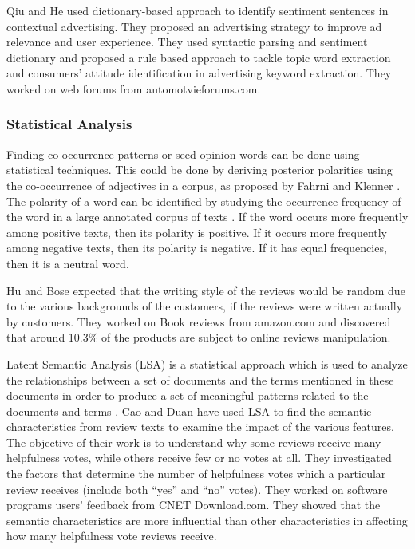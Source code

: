 Qiu and He \cite{qiu2010dasa} used dictionary-based approach to identify sentiment sentences in contextual advertising. They proposed an advertising strategy to improve ad relevance and user experience. They used syntactic parsing and sentiment dictionary and proposed a rule based approach to tackle topic word extraction and consumers’ attitude identification in advertising keyword extraction. They worked on web forums from automotvieforums.com. 



\subsubsection{Statistical Analysis}
Finding co-occurrence patterns or seed opinion words can be done using statistical techniques. This could be done by deriving posterior polarities using the co-occurrence of adjectives in a corpus, as proposed by Fahrni and Klenner \cite{fahrni2008old}.
The polarity of a word can be identified by studying the occurrence frequency of the word in a large annotated corpus of texts \cite{read2009weakly}. If the word occurs more frequently among positive texts, then its polarity is positive. If it occurs more frequently among negative texts, then its polarity is negative. If it has equal frequencies, then it is a neutral word.

Hu and Bose \cite{hu2012manipulation} expected that the writing style of the reviews would be random due to the various backgrounds of the customers, if the reviews were written actually by customers. They worked on Book reviews from amazon.com and discovered that around 10.3\% of the products are subject to online reviews manipulation.

Latent Semantic Analysis (LSA) is a statistical approach which is used to analyze the relationships between a set of documents and the terms mentioned in these documents in order to produce a set of meaningful patterns related to the documents and terms \cite{deerwester1990indexing}. Cao and Duan \cite{cao2011exploring} have used LSA to find the semantic characteristics from review texts to examine the impact of the various features. The objective of their work is to understand why some reviews receive many helpfulness votes, while others receive few or no votes at all. They investigated the factors that determine the number of helpfulness votes which a particular review receives (include both “yes” and “no” votes). They worked on software programs users’ feedback from CNET Download.com. They showed that the semantic characteristics are more influential than other characteristics in affecting how many helpfulness vote reviews receive.


